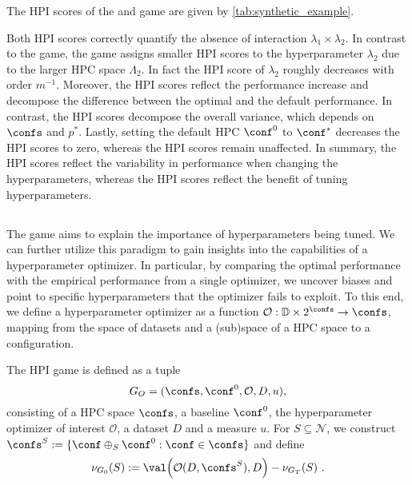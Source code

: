 \begin{theorem}
    The HPI scores of the \sensitivity and \tunability game are given by \cref{tab:synthetic_example}.
\end{theorem}

Both HPI scores correctly quantify the absence of interaction $\lambda_1 \times \lambda_2$.
In contrast to the \tunability game, the \sensitivity game assigns smaller HPI scores to the hyperparameter $\lambda_2$ due to the larger HPC space $\Lambda_2$. 
In fact the \sensitivity HPI score of $\lambda_2$ roughly decreases with order $m^{-1}$.
Moreover, the \tunability HPI scores reflect the performance increase and decompose the difference between the optimal and the default performance.
In contrast, the \sensitivity HPI scores decompose the overall variance, which depends on $\confs$ and $p^*$.
Lastly, setting the default HPC $\conf^0$ to $\conf^\ast$ decreases the \tunability HPI scores to zero, whereas the \sensitivity HPI scores remain unaffected.
In summary, the \sensitivity HPI scores reflect the variability in performance when changing the hyperparameters, whereas the \tunability HPI scores reflect the benefit of tuning hyperparameters.

\subsection{\opthabit}\label{sec:opthabit}
The \tunability game aims to explain the importance of hyperparameters being tuned. 
We can further utilize this paradigm to gain insights into the capabilities of a hyperparameter optimizer.
In particular, by comparing the optimal performance with the empirical performance from a single optimizer, we uncover biases and point to specific hyperparameters that the optimizer fails to exploit.
To this end, we define a hyperparameter optimizer as a function $\mathcal{O}: \mathbb{D} \times 2^{\confs} \rightarrow \confs$, mapping from the space of datasets and a (sub)space of a HPC space to a configuration. 

\begin{definition} \label{def:opthabit}
    The \opthabit HPI game is defined as a tuple 
    \[
    G_O = (\confs, \conf^0, \mathcal{O}, D, u),
    \]
    consisting of a HPC space $\confs$, a baseline $\conf^0$, the hyperparameter optimizer of interest $\mathcal O$, a dataset $D$ and a measure $u$.
    For $S \subseteq \mathcal N$, we construct $\confs^S := \{ \conf \oplus_S \conf^0: \conf \in \confs\}$ and define
        \begin{align*}
    \nu_{G_0}(S) := \val \Big(\mathcal{O}(D, \confs^S), D \Big)
    - \nu_{G_T}(S) \,\, .
    \end{align*}
\end{definition}

